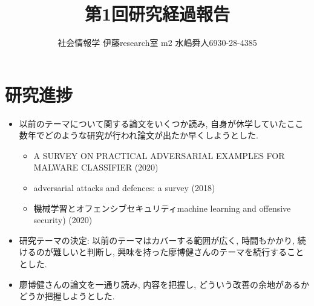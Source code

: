 \documentclass{article}
\title{第1回研究経過報告}
\author{社会情報学 伊藤research室 m2 水嶋舜人6930-28-4385}
\date{}
\begin{document}
\maketitle
\section{研究進捗}
\begin{itemize}
  \item 以前のテーマについて関する論文をいくつか読み, 自身が休学していたここ数年でどのような研究が行われ論文が出たか早くしようとした.
  \begin{itemize}
    \item A SURVEY ON PRACTICAL ADVERSARIAL EXAMPLES FOR MALWARE CLASSIFIER (2020)
    \item adversarial attacks and defences: a survey (2018)
    \item 機械学習とオフェンシブセキュリティmachine learning and offensive security) (2020)
  \end{itemize}
  \item 研究テーマの決定: 以前のテーマはカバーする範囲が広く, 時間もかかり, 続けるのが難しいと判断し, 興味を持った廖博健さんのテーマを続行することとした.
  \item 廖博健さんの論文を一通り読み, 内容を把握し, どういう改善の余地があるかどうか把握しようとした.
\end{itemize}
\end{document}
